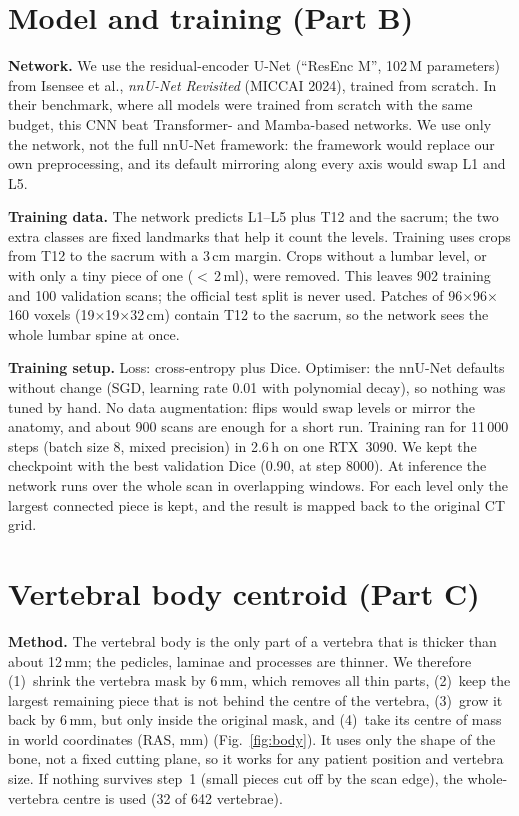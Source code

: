 \documentclass[10pt,a4paper]{article}
\begin{document}
\section{Model and training (Part B)}
\textbf{Network.} We use the residual-encoder U-Net (``ResEnc M'', 102\,M parameters) from Isensee et al., \emph{nnU-Net Revisited} (MICCAI 2024), trained from scratch. In their benchmark, where all models were trained from scratch with the same budget, this CNN beat Transformer- and Mamba-based networks. We use only the network, not the full nnU-Net framework: the framework would replace our own preprocessing, and its default mirroring along every axis would swap L1 and L5.

\textbf{Training data.} The network predicts L1--L5 plus T12 and the sacrum; the two extra classes are fixed landmarks that help it count the levels. Training uses crops from T12 to the sacrum with a 3\,cm margin. Crops without a lumbar level, or with only a tiny piece of one ($<$\,2\,ml), were removed. This leaves 902 training and 100 validation scans; the official test split is never used. Patches of 96$\times$96$\times$160 voxels (19$\times$19$\times$32\,cm) contain T12 to the sacrum, so the network sees the whole lumbar spine at once.

\textbf{Training setup.} Loss: cross-entropy plus Dice. Optimiser: the nnU-Net defaults without change (SGD, learning rate 0.01 with polynomial decay), so nothing was tuned by hand. No data augmentation: flips would swap levels or mirror the anatomy, and about 900 scans are enough for a short run. Training ran for 11\,000 steps (batch size 8, mixed precision) in 2.6\,h on one RTX~3090. We kept the checkpoint with the best validation Dice (0.90, at step 8000). At inference the network runs over the whole scan in overlapping windows. For each level only the largest connected piece is kept, and the result is mapped back to the original CT grid.

\section{Vertebral body centroid (Part C)}
\textbf{Method.} The vertebral body is the only part of a vertebra that is thicker than about 12\,mm; the pedicles, laminae and processes are thinner. We therefore
(1)~shrink the vertebra mask by 6\,mm, which removes all thin parts,
(2)~keep the largest remaining piece that is not behind the centre of the vertebra,
(3)~grow it back by 6\,mm, but only inside the original mask, and
(4)~take its centre of mass in world coordinates (RAS, mm) (Fig.~\ref{fig:body}).
It uses only the shape of the bone, not a fixed cutting plane, so it works for any patient position and vertebra size. If nothing survives step~1 (small pieces cut off by the scan edge), the whole-vertebra centre is used (32 of 642 vertebrae).
\end{document}
